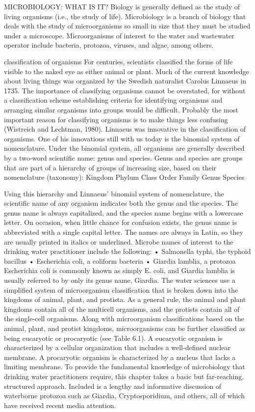 \documentclass{article}
\begin{document}
MICROBIOLOGY: WHAT IS IT? Biology is generally defined as the study of
living organisms (i.e., the study of life). Microbiology is a branch of
biology that deals with the study of microorganisms so small in size
that they must be studied under a microscope. Microorganisms of interest
to the water and wastewater operator include bacteria, protozoa,
viruses, and algae, among others.

classification of organisms For centuries, scientists classified the
forms of life visible to the naked eye as either animal or plant. Much
of the current knowledge about living things was organized by the
Swedish naturalist Carolus Linnaeus in 1735. The importance of
classifying organisms cannot be overstated, for without a classification
scheme establishing criteria for identifying organisms and arranging
similar organisms into groups would be difficult. Probably the most
important reason for classifying organisms is to make things less
confusing (Wistreich and Lechtman, 1980). Linnaeus was innovative in the
classification of organisms. One of his innovations still with us today
is the binomial system of nomenclature. Under the binomial system, all
organisms are generally described by a two-word scientific name: genus
and species. Genus and species are groups that are part of a hierarchy
of groups of increasing size, based on their nomenclature (taxonomy):
Kingdom Phylum Class Order Family Genus Species

Using this hierarchy and Linnaeus' binomial system of nomenclature, the
scientific name of any organism indicates both the genus and the
species. The genus name is always capitalized, and the species name
begins with a lowercase letter. On occasion, when little chance for
confusion exists, the genus name is abbreviated with a single capital
letter. The names are always in Latin, so they are usually printed in
italics or underlined. Microbe names of interest to the drinking water
practitioner include the following: • Salmonella typhi, the typhoid
bacillus • Escherichia coli, a coliform bacteria • Giardia lamblia, a
protozoa Escherichia coli is commonly known as simply E. coli, and
Giardia lamblia is usually referred to by only its genus name, Giardia.
The water sciences use a simplified system of microorganism
classification that is broken down into the kingdoms of animal, plant,
and protista. As a general rule, the animal and plant kingdoms contain
all of the multicell organisms, and the protists contain all of the
single-cell organisms. Along with microorganism classifications based on
the animal, plant, and protist kingdoms, microorganisms can be further
classified as being eucaryotic or procaryotic (see Table 6.1). A
eucaryotic organism is characterized by a cellular organization that
includes a well-defined nuclear membrane. A procaryotic organism is
characterized by a nucleus that lacks a limiting membrane. To provide
the fundamental knowledge of microbiology that drinking water
practitioners require, this chapter takes a basic but far-reaching,
structured approach. Included is a lengthy and informative discussion of
waterborne protozoa such as Giardia, Cryptosporidium, and others, all of
which have received recent media attention.
\end{document}
